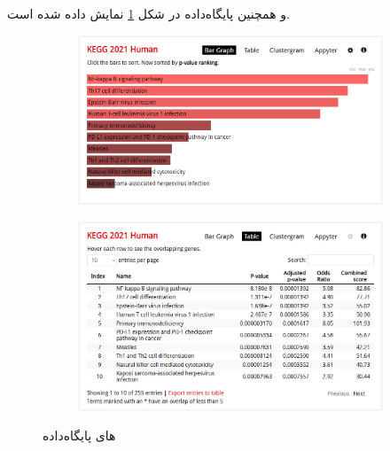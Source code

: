 \documentclass{article}
\begin{document}
و همچنین پایگاه‌داده  در شکل \ref{fig:enrichr-pathways-kegg} نمایش داده شده است.
\begin{figure}[h!]
	\begin{subfigure}{.53\columnwidth}
		\centering
		\includegraphics[width=\columnwidth]{figs/enrichr-pathways-kegg.jpg}
	\end{subfigure}
	\begin{subfigure}{.47\columnwidth}
		\centering
		\includegraphics[width=\columnwidth]{figs/enrichr-pathways-kegg-tab.jpg}
	\end{subfigure}
	\caption{های پایگاه‌داده }
	\label{fig:enrichr-pathways-kegg}
\end{figure}
\end{document}
